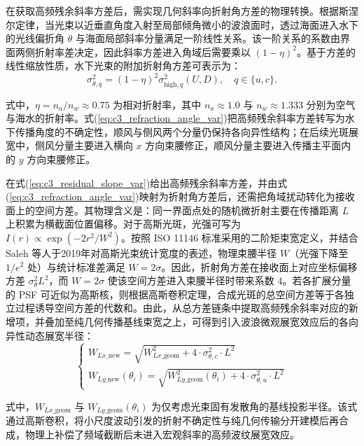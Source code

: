 在获取高频残余斜率方差后，需实现几何斜率向折射角方差的物理转换。根据斯涅尔定律，当光束以近垂直角度入射至局部倾角微小的波浪面时，透过海面进入水下的光线偏折角 $\theta$ 与海面局部斜率分量满足一阶线性关系。该一阶关系的系数由界面两侧折射率差决定，因此斜率方差进入角域后需要乘以 $(1-\eta)^2$。基于方差的线性缩放性质，水下光束的附加折射角方差可表示为：
\begin{equation}
	\sigma_{\theta,q}^2=(1-\eta)^2\sigma_{\mathrm{high},q}^2(U,D),
	\quad q\in\{u,c\}.
	\label{eq:c3_refraction_angle_var}
\end{equation}

式中，$\eta=n_a/n_w\approx 0.75$ 为相对折射率，其中 $n_a \approx 1.0$ 与 $n_w \approx 1.333$ 分别为空气与海水的折射率。式(\ref{eq:c3_refraction_angle_var})把高频残余斜率方差转写为水下传播角度的不确定性，顺风与侧风两个分量仍保持各向异性结构；在后续光斑展宽中，侧风分量主要进入横向 $x$ 方向束腰修正，顺风分量主要进入传播主平面内的 $y$ 方向束腰修正。

在式(\ref{eq:c3_residual_slope_var})给出高频残余斜率方差，并由式(\ref{eq:c3_refraction_angle_var})映射为折射角方差后，还需把角域扰动转化为接收面上的空间方差。其物理含义是：同一界面点处的随机微折射主要在传播距离 $L$ 上积累为横截面位置偏移。对于高斯光斑，光强可写为 $I(r)\propto\exp(-2r^2/W^2)$。按照 ISO 11146 标准采用的二阶矩束宽定义，并结合 Saleh 等人于2019年对高斯光束统计宽度的表述，物理束腰半径 $W$（光强下降至 $1/e^2$ 处）与统计标准差满足 $W = 2\sigma$。因此，折射角方差在接收面上对应坐标偏移方差 $\sigma_{\theta}^2 L^2$，而 $W=2\sigma$ 使该空间方差进入束腰半径时带来系数 $4$。若各扩展分量的 PSF 可近似为高斯核，则根据高斯卷积定理，合成光斑的总空间方差等于各独立过程诱导空间方差的代数和。由此，从总方差链条中提取高频残余斜率对应的新增项，并叠加至纯几何传播基线束宽之上，可得到引入波浪微观展宽效应后的各向异性动态展宽半径：
\begin{equation}
	\begin{cases}
		W_{Lx\_\mathrm{new}} = \sqrt{W_{Lx\_\mathrm{geom}}^2 + 4 \cdot \sigma_{\theta,c}^2 \cdot L^2} \\
		W_{Ly\_\mathrm{new}}(\theta_i) = \sqrt{W_{Ly\_\mathrm{geom}}^2(\theta_i) + 4 \cdot \sigma_{\theta,u}^2 \cdot L^2}
	\end{cases}
	\label{eq:dynamic_spot_compensation}
\end{equation}

式中，$W_{Lx\_\mathrm{geom}}$ 与 $W_{Ly\_\mathrm{geom}}(\theta_i)$ 为仅考虑光束固有发散角的基线投影半径。该式通过高斯卷积，将小尺度波动引发的折射不确定性与纯几何传输分开建模后再合成，物理上补偿了频域截断后未进入宏观斜率的高频波纹展宽效应。

